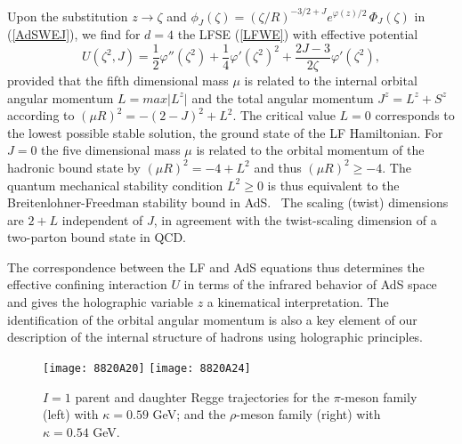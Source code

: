 \documentclass[prd,aps,onecolumn,nofootinbib]{revtex4}
\newcommand{\half}{{\frac{1}{2}}}
\begin{document}
  
Upon the substitution $z \! \to\! \zeta$  and 
$\phi_J(\zeta)   = \left(\zeta/R\right)^{-3/2 + J} e^{\varphi(z)/2} \, \Phi_J(\zeta)$ 
in (\ref{AdSWEJ}), we find for $d=4$ the LFSE (\ref{LFWE}) with effective potential~\cite{deTeramond:2010ge}
\begin{equation} \label{U}
U(\zeta^2, J) = \half \varphi''(\zeta^2) +\frac{1}{4} \varphi'(\zeta^2)^2  + \frac{2J - 3}{2 \zeta} \varphi'(\zeta^2) ,
\end{equation}
provided that the fifth dimensional mass $\mu$ is related to the internal orbital angular momentum $L = max \vert L^z \vert$ and the total angular momentum $J^z = L^z + S^z$ according to $(\mu R)^2 = - (2-J)^2 + L^2$.  The critical value  $L=0$  corresponds to the lowest possible stable solution, the ground state of the LF Hamiltonian.
For $J = 0$ the five dimensional mass $\mu$
 is related to the orbital  momentum of the hadronic bound state by
 $(\mu R)^2 = - 4 + L^2$ and thus  $(\mu R)^2 \ge - 4$. The quantum mechanical stability condition $L^2 \ge 0$ is thus equivalent to the Breitenlohner-Freedman stability bound in AdS.~\cite{Breitenlohner:1982jf}
The scaling (twist)  dimensions are $2 + L$ independent of $J$, in agreement with the twist-scaling dimension of a two-parton bound state in QCD.  

The correspondence between the LF and AdS equations  thus determines the effective confining interaction $U$ in terms of the infrared behavior of AdS space and gives the holographic variable $z$ a kinematical interpretation. The identification of the orbital angular momentum 
is also a key element of our description of the internal structure of hadrons using holographic principles.

\begin{figure}[h]
\centering
\texttt{[image: 8820A20]}  \hspace{0pt}
\texttt{[image: 8820A24]}
 \caption{$I = 1$ parent and daughter Regge trajectories for the $\pi$-meson family (left) with
$\kappa= 0.59$ GeV; and  the   $\rho$-meson
 family (right) with $\kappa= 0.54$ GeV.}
\label{pionspec}
\end{figure} 
\end{document}
